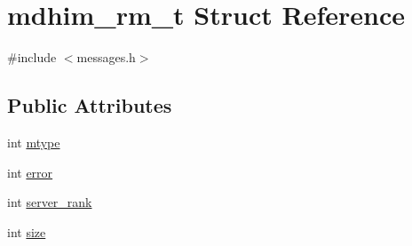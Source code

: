 \hypertarget{structmdhim__rm__t}{\section{mdhim\-\_\-rm\-\_\-t Struct Reference}
\label{d2/d0c/structmdhim__rm__t}
}


{\ttfamily \#include $<$messages.\-h$>$}

\subsection*{Public Attributes}
\begin{DoxyCompactItemize}
\item 
int \hyperlink{structmdhim__rm__t_ad4fc1bc6965fe36cf6bef6c2813dba8d}{mtype}
\item 
int \hyperlink{structmdhim__rm__t_af7305ef9c55d3d60b91610408a88893f}{error}
\item 
int \hyperlink{structmdhim__rm__t_a8c6b340ab11d8fb8c7d8540cb59d9246}{server\-\_\-rank}
\item 
int \hyperlink{structmdhim__rm__t_addf21a3b828da693b9953e4a0d7d0c21}{size}
\end{DoxyCompactItemize}


